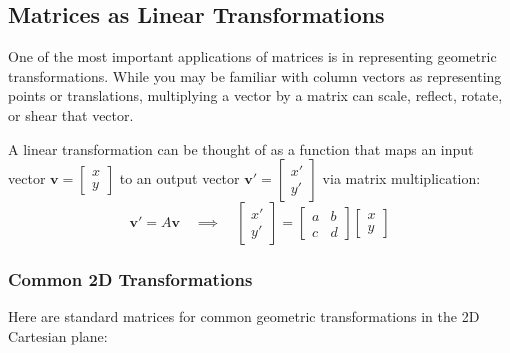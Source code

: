 
\subsection{Matrices as Linear Transformations}

One of the most important applications of matrices is in representing geometric transformations. While you may be familiar with column vectors as representing points or translations, multiplying a vector by a matrix can scale, reflect, rotate, or shear that vector. 

A linear transformation can be thought of as a function that maps an input vector $\mathbf{v} = \begin{bmatrix} x \\ y \end{bmatrix}$ to an output vector $\mathbf{v'} = \begin{bmatrix} x' \\ y' \end{bmatrix}$ via matrix multiplication:
\[
\mathbf{v'} = A\mathbf{v} \quad \implies \quad \begin{bmatrix} x' \\ y' \end{bmatrix} = \begin{bmatrix} a & b \\ c & d \end{bmatrix} \begin{bmatrix} x \\ y \end{bmatrix}
\]

\subsubsection*{Common 2D Transformations}
Here are standard matrices for common geometric transformations in the 2D Cartesian plane:

